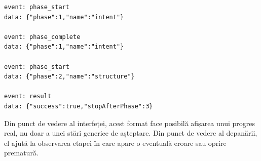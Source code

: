 \begin{lstlisting}[style=favigon,caption={Exemplu simplificat de flux SSE pentru pipeline-ul AI}]
event: phase_start
data: {"phase":1,"name":"intent"}

event: phase_complete
data: {"phase":1,"name":"intent"}

event: phase_start
data: {"phase":2,"name":"structure"}

event: result
data: {"success":true,"stopAfterPhase":3}
\end{lstlisting}

Din punct de vedere al interfeței, acest format face posibilă afișarea unui progres real, nu doar a unei stări generice de așteptare. Din punct de vedere al depanării, el ajută la observarea etapei în care apare o eventuală eroare sau oprire prematură.
